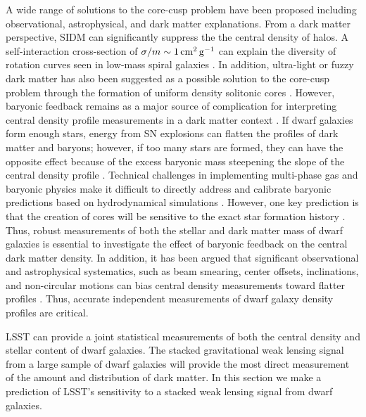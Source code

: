 A wide range of solutions to the core-cusp problem have been proposed including observational, astrophysical, and dark matter explanations.
From a dark matter perspective, SIDM can significantly suppress the the central density of halos.
A self-interaction cross-section of $\sigma / m \sim 1 \mathrm{\,cm}^2 \mathrm{\,g}^{-1}$ can explain the diversity of rotation curves seen in low-mass spiral galaxies \citep[\eg][]{1504.01437,2017PhRvL.119k1102K,1705.02358}.
In addition, ultra-light or fuzzy dark matter has also been suggested as a possible solution to the core-cusp problem through the formation of uniform density solitonic cores \citep[\eg][]{1502.03456,Hui:2017}. 
However, baryonic feedback remains as a major source of complication for interpreting central density profile measurements in a dark matter context \citep{1996MNRAS.283L..72N,2005MNRAS.356..107R,2008Sci...319..174M,2012MNRAS.421.3464P,Madau:2014,Read:2016}. 
If dwarf galaxies form enough stars, energy from SN explosions can flatten the profiles of dark matter and baryons; however, if too many stars are formed, they can have the opposite effect because of the excess baryonic mass steepening the slope of the central density profile \citep{Bullock:2017}.
Technical challenges in implementing multi-phase gas and baryonic physics make it difficult to directly address and calibrate baryonic predictions based on hydrodynamical simulations \citep{Tollet:2016,1611.02281,Sawala:2016}.
However, one key prediction is that the creation of cores will be sensitive to the exact star formation history \citep[\eg][]{governato2012,dicintio2014,onorbe2015,Read:2016,read2018,1811.11768,2019MNRAS.tmp....3R}.
Thus, robust measurements of both the stellar and dark matter mass of dwarf galaxies is essential to investigate the effect of baryonic feedback on the central dark matter density.
In addition, it has been argued that significant observational and astrophysical systematics, such as beam smearing, center offsets, inclinations, and non-circular motions can bias central density measurements toward flatter profiles \citep[\eg][]{astro-ph/0006048,2004ApJ...617.1059R,2008AJ....136.2761O,2016MNRAS.462.3628R}. 
Thus, accurate independent measurements of dwarf galaxy density profiles are critical.

LSST can provide a joint statistical measurements of both the central density and stellar content of dwarf galaxies. 
The stacked gravitational weak lensing signal from a large sample of dwarf galaxies will provide the most direct measurement of the amount and distribution of dark matter.  
In this section we make a prediction of LSST's sensitivity to a stacked weak lensing signal from dwarf galaxies.

